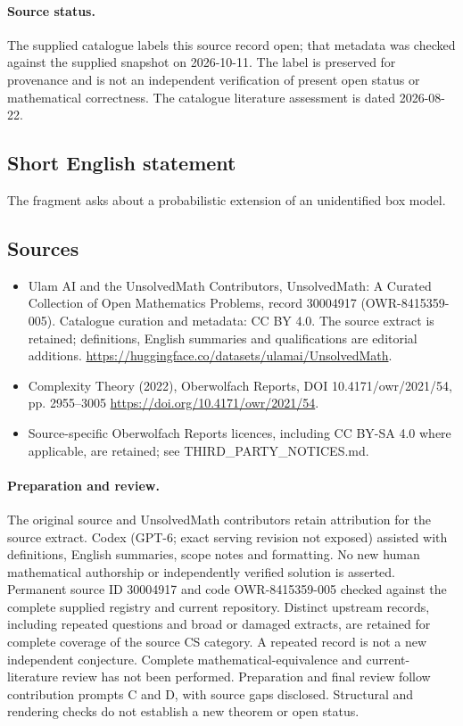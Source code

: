 \documentclass[11pt]{article}
\begin{document}
\paragraph{Source status.}
The supplied catalogue labels this source record open; that metadata was checked against the supplied snapshot on 2026-10-11. The label is preserved for provenance and is not an independent verification of present open status or mathematical correctness. The catalogue literature assessment is dated 2026-08-22.
\subsection{Short English statement}
The fragment asks about a probabilistic extension of an unidentified box model.
\subsection{Sources}
\begin{itemize}
\item[\hypertarget{source:30004917:1}{S1}] Ulam AI and the UnsolvedMath Contributors, UnsolvedMath: A Curated Collection of Open Mathematics Problems, record 30004917 (OWR-8415359-005). Catalogue curation and metadata: CC BY 4.0. The source extract is retained; definitions, English summaries and qualifications are editorial additions.
\url{https://huggingface.co/datasets/ulamai/UnsolvedMath}.
\item[\hypertarget{source:30004917:2}{S2}] Complexity Theory (2022), Oberwolfach Reports, DOI 10.4171/owr/2021/54, pp. 2955--3005
\url{https://doi.org/10.4171/owr/2021/54}.
\item Source-specific Oberwolfach Reports licences, including CC BY-SA 4.0 where applicable, are retained; see THIRD\_PARTY\_NOTICES.md.
\end{itemize}
\paragraph{Preparation and review.}
The original source and UnsolvedMath contributors retain attribution for the source extract. Codex (GPT-6; exact serving revision not exposed) assisted with definitions, English summaries, scope notes and formatting. No new human mathematical authorship or independently verified solution is asserted. Permanent source ID 30004917 and code OWR-8415359-005 checked against the complete supplied registry and current repository. Distinct upstream records, including repeated questions and broad or damaged extracts, are retained for complete coverage of the source CS category. A repeated record is not a new independent conjecture. Complete mathematical-equivalence and current-literature review has not been performed. Preparation and final review follow contribution prompts C and D, with source gaps disclosed. Structural and rendering checks do not establish a new theorem or open status.
\label{end:30004917}
\end{document}
